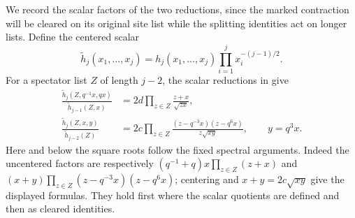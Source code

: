 We record the scalar factors of the two reductions, since the marked
contraction will be cleared on its original site list while the
splitting identities act on longer lists. Define the centered scalar
\[
 \widetilde h_j(x_1,\ldots,x_j)
 =h_j(x_1,\ldots,x_j)\prod_{i=1}^j x_i^{-(j-1)/2}.
\]
For a spectator list $Z$ of length $j-2$, the scalar reductions in
\cite[Proposition~2.2 and the proof of Lemma~2.3]{Electric} give
\begin{align}
 \frac{\widetilde h_j(Z,q^{-1}x,qx)}
      {\widetilde h_{j-1}(Z,x)}
 &=2d\prod_{z\in Z}\frac{z+x}{\sqrt{zx}},
 \label{eq:vacuum-centered-merge}\\
 \frac{\widetilde h_j(Z,x,y)}{\widetilde h_{j-2}(Z)}
 &=2c\prod_{z\in Z}
       \frac{(z-q^{-3}x)(z-q^6x)}{z\sqrt{xy}},
 \qquad y=q^3x.
 \label{eq:vacuum-centered-deletion}
\end{align}
Here and below the square roots follow the fixed spectral arguments.
Indeed the uncentered factors are respectively
$(q^{-1}+q)x\prod_{z\in Z}(z+x)$ and
$(x+y)\prod_{z\in Z}(z-q^{-3}x)(z-q^6x)$; centering and
$x+y=2c\sqrt{xy}$ give the displayed formulas. They hold first
where the scalar quotients are defined and then as cleared identities.
